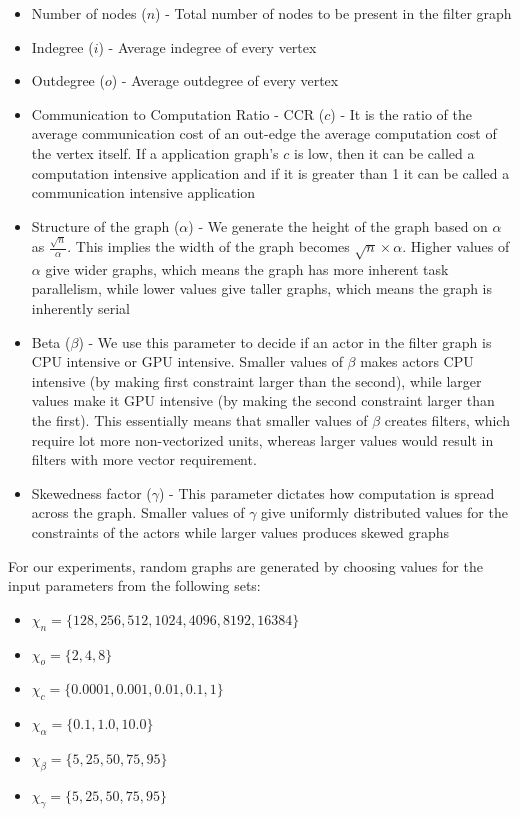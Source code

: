 \begin{itemize}
\item Number of nodes ($n$) - Total number of nodes to be present in the
  filter graph
\item Indegree ($i$) - Average indegree of every vertex
\item Outdegree ($o$) - Average outdegree of every vertex
\item Communication to Computation Ratio - CCR ($c$) - It is the ratio
  of the average communication cost of an out-edge the average
  computation cost of the vertex itself. If a application graph's $c$ is low,
  then it can be called a computation intensive application and if it is greater
  than 1 it can be called a communication intensive application
\item Structure of the graph ($\alpha$) - We generate the height of the
  graph based on $\alpha$ as $\frac{\sqrt{n}}{\alpha}$. This implies the
  width of the graph becomes $\sqrt{n} \times {\alpha}$. Higher values of
  $\alpha$ give wider graphs, which means the graph has more inherent
  task parallelism, while lower values give taller graphs, which means
  the graph is inherently serial
\item Beta ($\beta$) - We use this parameter to decide if an actor in
  the filter graph is CPU intensive or GPU intensive. Smaller values of
  $\beta$ makes actors CPU intensive (by making first constraint larger
  than the second), while larger values make it GPU intensive (by making
  the second constraint larger than the first). This essentially means
  that smaller values of $\beta$ creates filters, which require lot more
  non-vectorized units, whereas larger values would result in filters
  with more vector requirement.
\item Skewedness factor ($\gamma$) - This parameter dictates how
  computation is spread across the graph. Smaller values of $\gamma$
  give uniformly distributed values for the constraints of the actors
  while larger values produces skewed graphs
\end{itemize}

\noindent For our experiments, random graphs are generated by choosing values for
the input parameters from the following sets:

\begin{itemize}
\item $\chi_{n} = \{128, 256, 512, 1024, 4096, 8192, 16384\}$
\item $\chi_{o} = \{2, 4, 8\}$
\item $\chi_{c} = \{0.0001, 0.001, 0.01, 0.1, 1\}$
\item $\chi_{\alpha} = \{0.1, 1.0, 10.0\}$
\item $\chi_{\beta} = \{5, 25, 50, 75, 95\}$
\item $\chi_{\gamma} = \{5, 25, 50, 75, 95\}$
\end{itemize}

